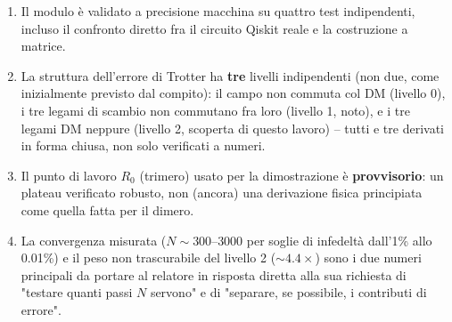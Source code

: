 \documentclass[11pt,a4paper]{article}
\begin{document}
\begin{enumerate}
\item Il modulo è validato a precisione macchina su quattro test
indipendenti, incluso il confronto diretto fra il circuito Qiskit reale e
la costruzione a matrice.
\item La struttura dell'errore di Trotter ha \textbf{tre} livelli
indipendenti (non due, come inizialmente previsto dal compito): il campo
non commuta col DM (livello 0), i tre legami di scambio non commutano fra
loro (livello 1, noto), e i tre legami DM neppure (livello 2, scoperta di
questo lavoro) -- tutti e tre derivati in forma chiusa, non solo verificati
a numeri.
\item Il punto di lavoro $R_0$ (trimero) usato per la dimostrazione è
\textbf{provvisorio}: un plateau verificato robusto, non (ancora) una
derivazione fisica principiata come quella fatta per il dimero.
\item La convergenza misurata ($N\sim300$--$3000$ per soglie di infedeltà
dall'1\% allo 0.01\%) e il peso non trascurabile del livello 2
($\sim4.4\times$) sono i due numeri principali da portare al relatore in
risposta diretta alla sua richiesta di "testare quanti passi $N$ servono"
e di "separare, se possibile, i contributi di errore".
\end{enumerate}
\end{document}
